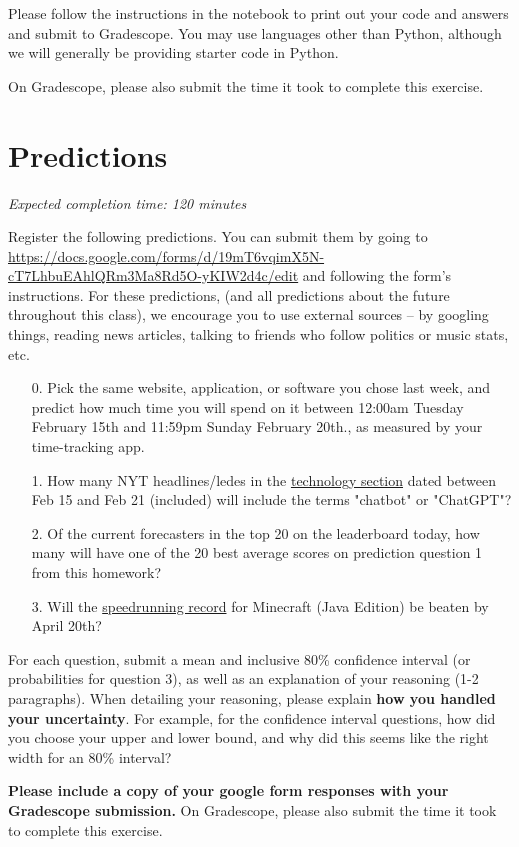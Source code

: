 \documentclass[11pt]{article}
\begin{document}
Please follow the instructions in the notebook to print out your code and answers and submit to Gradescope. You may use languages other than Python, although we will generally be providing starter code in Python.

On Gradescope, please also submit the time it took to complete this exercise.

\section*{Predictions}

\emph{Expected completion time: 120 minutes}

Register the following predictions. You can submit them by going to \url{https://docs.google.com/forms/d/19mT6vqimX5N-cT7LhbuEAhlQRm3Ma8Rd5O-yKIW2d4c/edit} and following the form's instructions. For these predictions, (and all predictions about the future throughout this class), we encourage you to use external sources -- by googling things, reading news articles, talking to friends who follow politics or music stats, etc.

\begin{enumerate}
	\item[0.] Pick the same website, application, or software you chose last week, and predict how much time you will spend on it between 12:00am Tuesday February 15th and 11:59pm Sunday February 20th., as measured by your time-tracking app.
	\item[1.] How many NYT headlines/ledes in the \href{https://www.nytimes.com/section/technology}{technology section} dated between Feb 15 and Feb 21 (included) will include the terms "chatbot" or "ChatGPT"?
	\item[2.] Of the current forecasters in the top 20 on the leaderboard today, how many will have one of the 20 best average scores on prediction question 1 from this homework?
	\item[3.] Will the \href{https://www.speedrun.com/mc?h=Any_Glitchless-Random_Seed-1.16&x=mkeyl926-r8rg67rn.21d4zvp1-wl33kewl.4qye4731}{speedrunning record} for Minecraft (Java Edition) be beaten by April 20th?
\end{enumerate}

For each question, submit a mean and inclusive 80\% confidence interval (or probabilities for question 3), as well as an explanation of your reasoning (1-2 paragraphs). When detailing your reasoning, please explain \textbf{how you handled your uncertainty}. For example, for the confidence interval questions, how did you choose your upper and lower bound, and why did this seems like the right width for an 80\% interval?

\textbf{Please include a copy of your google form responses with your Gradescope submission.} On Gradescope, please also submit the time it took to complete this exercise.
\end{document}
